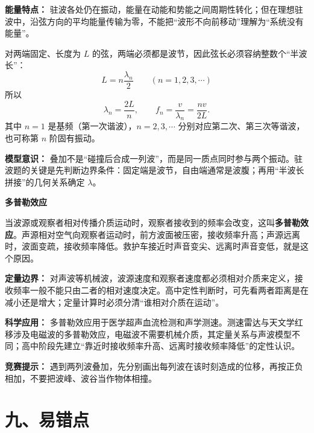\begin{competitionbox}
\textbf{能量特点：} 驻波各处仍在振动，能量在动能和势能之间周期性转化；但在理想驻波中，沿弦方向的平均能量传输为零，不能把“波形不向前移动”理解为“系统没有能量”。

\begin{center}


\label{fig:standing-wave-modes}
\end{center}

对两端固定、长度为 $L$ 的弦，两端必须都是波节，因此弦长必须容纳整数个“半波长”：
\[
L=n\frac{\lambda_n}{2}\qquad(n=1,2,3,\cdots)
\]
所以
\[
\lambda_n=\frac{2L}{n},\qquad f_n=\frac{v}{\lambda_n}=\frac{nv}{2L}.
\]
其中 $n=1$ 是基频（第一次谐波），$n=2,3,\cdots$ 分别对应第二次、第三次等谐波，也可称第 $n$ 阶固有振动。

\textbf{模型意识：} 叠加不是“碰撞后合成一列波”，而是同一质点同时参与两个振动。驻波题的关键是先判断边界条件：固定端是波节，自由端通常是波腹；再用“半波长拼接”的几何关系确定 $\lambda$。

\medskip
\textbf{多普勒效应}

当波源或观察者相对传播介质运动时，观察者接收到的频率会改变，这叫\textbf{多普勒效应}。声源相对空气向观察者运动时，前方波面被压密，接收频率升高；声源远离时，波面变疏，接收频率降低。救护车接近时声音变尖、远离时声音变低，就是这个原因。

\begin{center}


\label{fig:doppler-wavefronts}
\end{center}

\textbf{定量边界：} 对声波等机械波，波源速度和观察者速度都必须相对介质来定义，接收频率一般不能只由二者的相对速度决定。高中定性判断时，可先看两者距离是在减小还是增大；定量计算时必须分清“谁相对介质在运动”。

\textbf{科学应用：} 多普勒效应用于医学超声血流检测和声学测速。测速雷达与天文学红移涉及电磁波的多普勒效应，电磁波不需要机械介质，其定量关系与声波模型不同；高中阶段先建立“靠近时接收频率升高、远离时接收频率降低”的定性认识。

\textbf{竞赛提示：} 遇到两列波叠加，先分别画出每列波在该时刻造成的位移，再按正负相加，不要把波峰、波谷当作物体相撞。
\end{competitionbox}

\section*{九、易错点}

